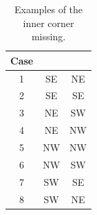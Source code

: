 \documentclass[sensors,article,accept,moreauthors,pdftex,10pt,a4paper]{mdpi}
\begin{document}
 \begin{table}[H]
	\centering
	\begin{tabular}{ccc}
		\toprule
		\textbf{Case} & \boldmath{$(R_i, R_{i+1})$} & \boldmath{$(R_{i+1}, R_{i+2})$}\\
		\midrule
		1 & SE & NE \\
		2 & SE & SE \\
		3 & NE & SW \\
		4 & NE & NW \\
		5 & NW & NW \\
		6 & NW & SW \\
		7 & SW & SE \\
		8 & SW & NE \\
		\bottomrule
	\end{tabular}
	\caption{Examples of the inner corner missing.}
	\label{table:ex_innerCornerMissing}
\end{table}
\end{document}
